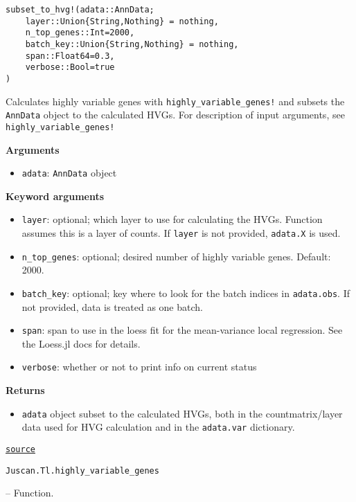\documentclass[oneside]{memoir}
\begin{document}
\begin{adjustwidth}{2em}{0pt}


\begin{verbatim}
subset_to_hvg!(adata::AnnData;
    layer::Union{String,Nothing} = nothing,
    n_top_genes::Int=2000,
    batch_key::Union{String,Nothing} = nothing,
    span::Float64=0.3,
    verbose::Bool=true
)
\end{verbatim}

Calculates highly variable genes with \texttt{highly\_variable\_genes!} and subsets the \texttt{AnnData} object to the calculated HVGs.  For description of input arguments, see \texttt{highly\_variable\_genes!}

\textbf{Arguments}

\begin{itemize}
\item \texttt{adata}: \texttt{AnnData} object

\end{itemize}
\textbf{Keyword arguments}

\begin{itemize}
\item \texttt{layer}: optional; which layer to use for calculating the HVGs. Function assumes this is a layer of counts. If \texttt{layer} is not provided, \texttt{adata.X} is used.


\item \texttt{n\_top\_genes}: optional; desired number of highly variable genes. Default: 2000.


\item \texttt{batch\_key}: optional; key where to look for the batch indices in \texttt{adata.obs}. If not provided, data is treated as one batch.


\item \texttt{span}: span to use in the loess fit for the mean-variance local regression. See the Loess.jl docs for details.


\item \texttt{verbose}: whether or not to print info on current status

\end{itemize}
\textbf{Returns}

\begin{itemize}
\item \texttt{adata} object subset to the calculated HVGs, both in the countmatrix/layer data used for HVG calculation and in the \texttt{adata.var} dictionary.

\end{itemize}


\href{https://github.com/zehua0417/Juscan.jl/blob/393ad1b827b678ea98a738f92af658ee9ed9a403/src/tools/hvg.jl#L221-L245}{\texttt{source}}


\end{adjustwidth}
\hypertarget{13294501160222504970}{\texttt{Juscan.Tl.highly\_variable\_genes}}  -- {Function.}
\end{document}
